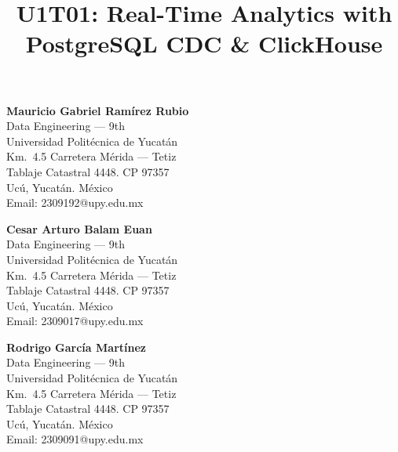 \documentclass[11pt]{article}
\title{U1T01: Real-Time Analytics with PostgreSQL CDC \& ClickHouse}
\date{}
\begin{document}
\maketitle
\thispagestyle{empty}

\vspace{-1.5cm}

\begin{center}

\begin{minipage}[t]{0.30\textwidth}
\centering
\textbf{Mauricio Gabriel Ram\'{i}rez Rubio} \\[0.2em]
Data Engineering --- 9th \\
Universidad Polit\'{e}cnica de Yucat\'{a}n \\
Km.\ 4.5 Carretera M\'{e}rida --- Tetiz \\
Tablaje Catastral 4448. CP 97357 \\
Uc\'{u}, Yucat\'{a}n. M\'{e}xico \\
Email: 2309192@upy.edu.mx
\end{minipage}
\hfill
\begin{minipage}[t]{0.30\textwidth}
\centering
\textbf{Cesar Arturo Balam Euan } \\[0.2em]
Data Engineering --- 9th \\
Universidad Polit\'{e}cnica de Yucat\'{a}n \\
Km.\ 4.5 Carretera M\'{e}rida --- Tetiz \\
Tablaje Catastral 4448. CP 97357 \\
Uc\'{u}, Yucat\'{a}n. M\'{e}xico \\
Email: 2309017@upy.edu.mx
\end{minipage}
\hfill
\begin{minipage}[t]{0.30\textwidth}
\centering
\textbf{Rodrigo Garc\'{i}a Mart\'{i}nez} \\[0.2em]
Data Engineering --- 9th \\
Universidad Polit\'{e}cnica de Yucat\'{a}n \\
Km.\ 4.5 Carretera M\'{e}rida --- Tetiz \\
Tablaje Catastral 4448. CP 97357 \\
Uc\'{u}, Yucat\'{a}n. M\'{e}xico \\
Email: 2309091@upy.edu.mx
\end{minipage}

\vspace{1.2cm}


\end{center}
\end{document}
